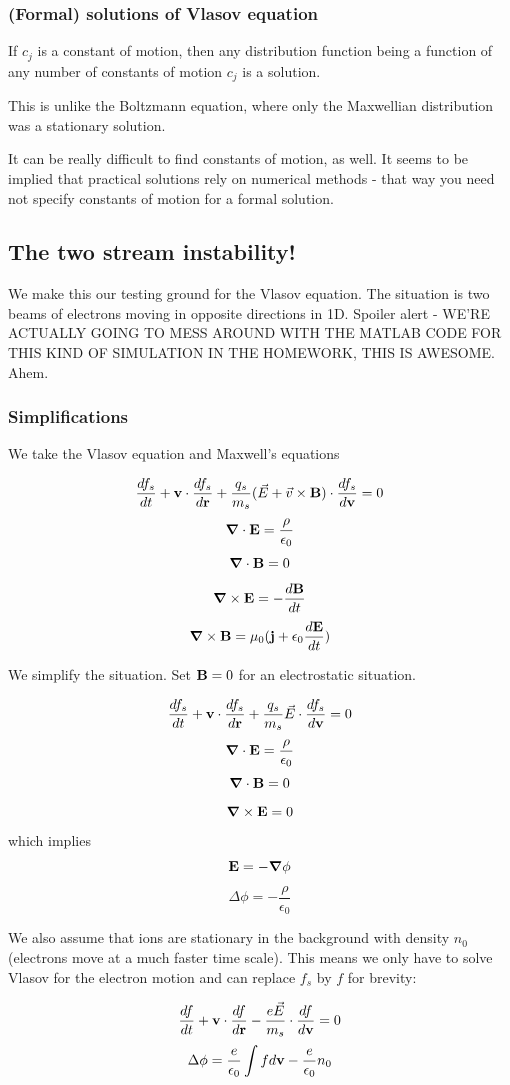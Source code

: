 \subsubsection{(Formal) solutions of Vlasov equation}
If $c_j$ is a constant of motion, then any distribution function being a function of any number of constants of motion $c_j$  is a solution.

This is unlike the Boltzmann equation, where only the Maxwellian distribution was a stationary solution.

It can be really difficult to find constants of motion, as well. It seems to be implied that practical solutions rely on numerical methods - that way you need not specify constants of motion for a formal solution.

\subsection{The two stream instability!}
We make this our testing ground for the Vlasov equation. The situation is two beams of electrons moving in opposite directions in 1D. Spoiler alert - WE'RE ACTUALLY GOING TO MESS AROUND WITH THE MATLAB CODE FOR THIS KIND OF SIMULATION IN THE HOMEWORK, THIS IS AWESOME. Ahem.
\subsubsection{Simplifications}
We take the Vlasov equation and Maxwell's equations

\[\frac{d f_s}{d t} + \mathbf{v} \cdot \frac{d f_s}{d \mathbf{r}} + \frac{q_s}{m_s} (\vec{E} + \vec{v} \times \mathbf{B}) \cdot \frac{d f_s}{d \mathbf{v}} = 0\]
\[ \mbox{\boldmath$ \nabla $} \cdot \mathbf{\mathbf{E}} = \frac{\rho}{\epsilon_0} \]
\[ \mbox{\boldmath$ \nabla $} \cdot \mathbf{\mathbf{B}} = 0 \]
\[ \mbox{\boldmath$ \nabla $} \times \mathbf{\mathbf{E}} = -\frac{d \mathbf{B}}{d t} \]
\[ \mbox{\boldmath$ \nabla $} \times \mathbf{\mathbf{B}} = \mu_0 ( \mathbf{j} + \epsilon_0 \frac{d \mathbf{E}}{d t}) \]

We simplify the situation. Set $\mathbf{B} = 0$ for an electrostatic situation.

\[\frac{d f_s}{d t} + \mathbf{v} \cdot \frac{d f_s}{d \mathbf{r}} + \frac{q_s}{m_s} \vec{E} \cdot \frac{d f_s}{d \mathbf{v}} = 0\]
\[ \mbox{\boldmath$ \nabla $} \cdot \mathbf{\mathbf{E}} = \frac{\rho}{\epsilon_0} \]
\[ \mbox{\boldmath$ \nabla $} \cdot \mathbf{\mathbf{B}} = 0 \]
\[ \mbox{\boldmath$ \nabla $} \times \mathbf{\mathbf{E}} = 0 \]
which implies
\[\mathbf{E} = -\mbox{\boldmath$ \nabla $} \phi\]
\[\Delta\phi = -\frac{\rho}{\epsilon_0} \]

We also assume that ions are stationary in the background with density $n_0$ (electrons move at a much faster time scale). This means we only have to solve Vlasov for the electron motion and can replace $f_s$ by $f$ for brevity:

\[\frac{d f}{d t} + \mathbf{v} \cdot \frac{d f}{d \mathbf{r}} - \frac{e \vec{E}}{m_s} \cdot \frac{d f}{d \mathbf{v}} = 0\]
\[\Delta\phi = \frac{e}{\epsilon_0} \int f d\mathbf{v} - \frac{e}{\epsilon_0} n_0\]

